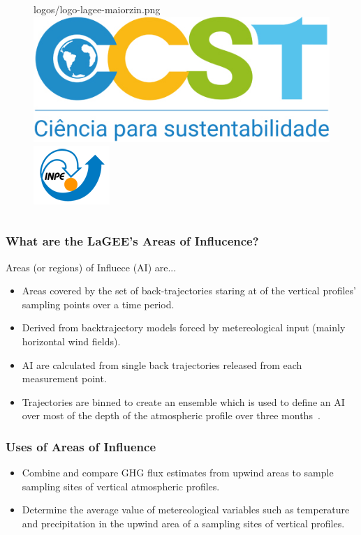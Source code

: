 \documentclass[aspectratio=169]{beamer}
\begin{document}
\begin{frame}
\begin{columns}
\begin{column}{0.5\textwidth}
\begin{figure}
                 {logos/logo-lagee-maiorzin.png}\newline
                 \includegraphics[scale=.17]
                 {logos/ccst.jpg}
                 \includegraphics[scale=.8]
                 {logos/logoinpe-azul-menor.png}
             \end{figure}
         \end{column}
     \end{columns}
 \end{frame}

\begin{frame}
    \frametitle{What are the LaGEE's Areas of Influcence?}
    Areas (or regions) of Influece (AI) are...
    \begin{itemize}
        \item Areas covered by the set of back-trajectories staring at 
            of the vertical profiles' sampling points over a time period.
        \item Derived from backtrajectory models forced by metereological input
            (mainly horizontal wind fields).
        \item AI are calculated from single back trajectories released from 
            each measurement point.
        \item Trajectories are binned to create an ensemble which is used to
            define an AI over most of the depth of the atmospheric profile over
            three months~\cite{cassol2020}.
    \end{itemize}
\end{frame}

\begin{frame}
    \frametitle{Uses of Areas of Influence}
    \begin{itemize}
        \item Combine and compare GHG flux estimates from upwind areas 
            to sample sampling sites of vertical atmospheric profiles.
        \item Determine the average value of metereological variables
            such as temperature and precipitation in the upwind area
            of a sampling sites of vertical profiles.
    \end{itemize}
\end{frame}
\end{document}
